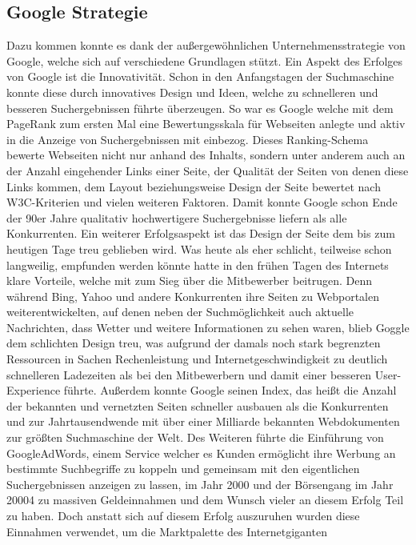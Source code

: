 \subsection{Google Strategie}\label{subsec:google-strategie}
Dazu kommen konnte es dank der außergewöhnlichen Unternehmensstrategie von Google, welche sich auf verschiedene Grundlagen
stützt.
Ein Aspekt des Erfolges von Google ist die Innovativität.
Schon in den Anfangstagen der Suchmaschine konnte diese durch innovatives Design und Ideen, welche zu schnelleren und
besseren Suchergebnissen führte überzeugen.
So war es Google welche mit dem PageRank zum ersten Mal eine Bewertungsskala für Webseiten anlegte und aktiv in die
Anzeige von Suchergebnissen mit einbezog.
Dieses Ranking-Schema bewerte Webseiten nicht nur anhand des Inhalts, sondern unter anderem auch an der Anzahl
eingehender Links einer Seite, der Qualität der Seiten von denen diese Links kommen, dem Layout beziehungsweise Design
der Seite bewertet nach W3C-Kriterien und vielen weiteren Faktoren.
Damit konnte Google schon Ende der 90er Jahre qualitativ hochwertigere Suchergebnisse liefern als alle Konkurrenten.
Ein weiterer Erfolgsaspekt ist das Design der Seite dem bis zum heutigen Tage treu geblieben wird.
Was heute als eher schlicht, teilweise schon langweilig, empfunden werden könnte hatte in den frühen Tagen des Internets
klare Vorteile, welche mit zum Sieg über die Mitbewerber beitrugen.
Denn während Bing, Yahoo und andere Konkurrenten ihre Seiten zu Webportalen weiterentwickelten, auf denen neben der
Suchmöglichkeit auch aktuelle Nachrichten, dass Wetter und weitere Informationen zu sehen waren, blieb Goggle dem schlichten
Design treu, was aufgrund der damals noch stark begrenzten Ressourcen in Sachen Rechenleistung und Internetgeschwindigkeit
zu deutlich schnelleren Ladezeiten als bei den Mitbewerbern und damit einer besseren User-Experience führte.
Außerdem konnte Google seinen Index, das heißt die Anzahl der bekannten und vernetzten Seiten schneller ausbauen als die
Konkurrenten und zur Jahrtausendwende mit über einer Milliarde bekannten Webdokumenten zur größten Suchmaschine der Welt.
Des Weiteren führte die Einführung von GoogleAdWords, einem Service welcher es Kunden ermöglicht ihre Werbung an
bestimmte Suchbegriffe zu koppeln und gemeinsam mit den eigentlichen Suchergebnissen anzeigen zu lassen, im Jahr 2000 und
der Börsengang im Jahr 20004 zu massiven Geldeinnahmen und dem Wunsch vieler an diesem Erfolg Teil zu haben.
Doch anstatt sich auf diesem Erfolg auszuruhen wurden diese Einnahmen verwendet, um die Marktpalette des Internetgiganten
